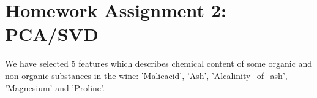\section{Homework Assignment 2: PCA/SVD}

We have selected 5 features which describes chemical content of some organic and non-organic substances in the wine: 'Malicacid', 'Ash', 'Alcalinity\_of\_ash', 'Magnesium' and 'Proline'.

